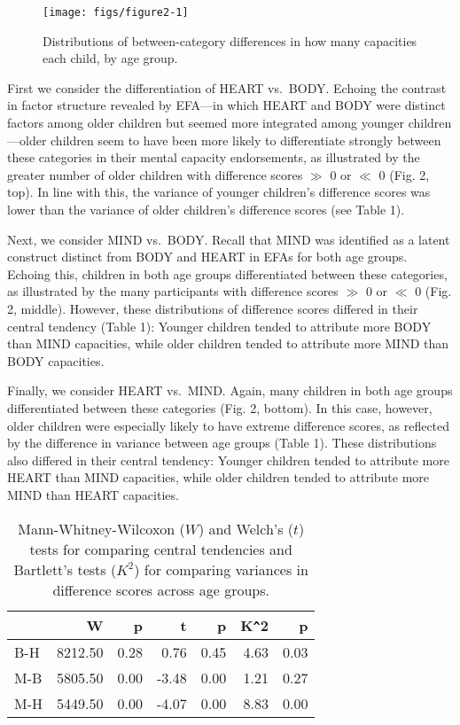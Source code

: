 \documentclass[10pt, letterpaper]{article}
\newenvironment{CodeChunk}{}{}
\begin{document}
\begin{CodeChunk}
\begin{figure}[tb]
\texttt{[image: figs/figure2-1]} \caption[Distributions of between-category differences in how many capacities each child, by age group]{Distributions of between-category differences in how many capacities each child, by age group.}\label{fig:figure2}
\end{figure}
\end{CodeChunk}

First we consider the differentiation of HEART vs.~BODY. Echoing the
contrast in factor structure revealed by EFA---in which HEART and BODY
were distinct factors among older children but seemed more integrated
among younger children---older children seem to have been more likely to
differentiate strongly between these categories in their mental capacity
endorsements, as illustrated by the greater number of older children
with difference scores \(\gg\) 0 or \(\ll\) 0 (Fig. 2, top). In line
with this, the variance of younger children's difference scores was
lower than the variance of older children's difference scores (see Table
1).

Next, we consider MIND vs.~BODY. Recall that MIND was identified as a
latent construct distinct from BODY and HEART in EFAs for both age
groups. Echoing this, children in both age groups differentiated between
these categories, as illustrated by the many participants with
difference scores \(\gg\) 0 or \(\ll\) 0 (Fig. 2, middle). However,
these distributions of difference scores differed in their central
tendency (Table 1): Younger children tended to attribute more BODY than
MIND capacities, while older children tended to attribute more MIND than
BODY capacities.

Finally, we consider HEART vs.~MIND. Again, many children in both age
groups differentiated between these categories (Fig. 2, bottom). In this
case, however, older children were especially likely to have extreme
difference scores, as reflected by the difference in variance between
age groups (Table 1). These distributions also differed in their central
tendency: Younger children tended to attribute more HEART than MIND
capacities, while older children tended to attribute more MIND than
HEART capacities.

\begin{table}[ht]
\centering
\begin{tabular}{l|rr|rr|rr}
  \hline
 & W & p & t & p & K\verb|^|2 & p \\ 
  \hline
B-H & 8212.50 & 0.28 &  0.76 & 0.45 & 4.63 & 0.03 \\ 
  M-B & 5805.50 & 0.00 & -3.48 & 0.00 & 1.21 & 0.27 \\ 
  M-H & 5449.50 & 0.00 & -4.07 & 0.00 & 8.83 & 0.00 \\ 
   \hline
\end{tabular}
\caption{Mann-Whitney-Wilcoxon ($   {W}$) and Welch's ($    {t}$) tests for comparing central tendencies and Bartlett's tests ($    {K^2}$) for comparing variances in difference scores across age groups.} 
\end{table}
\end{document}
